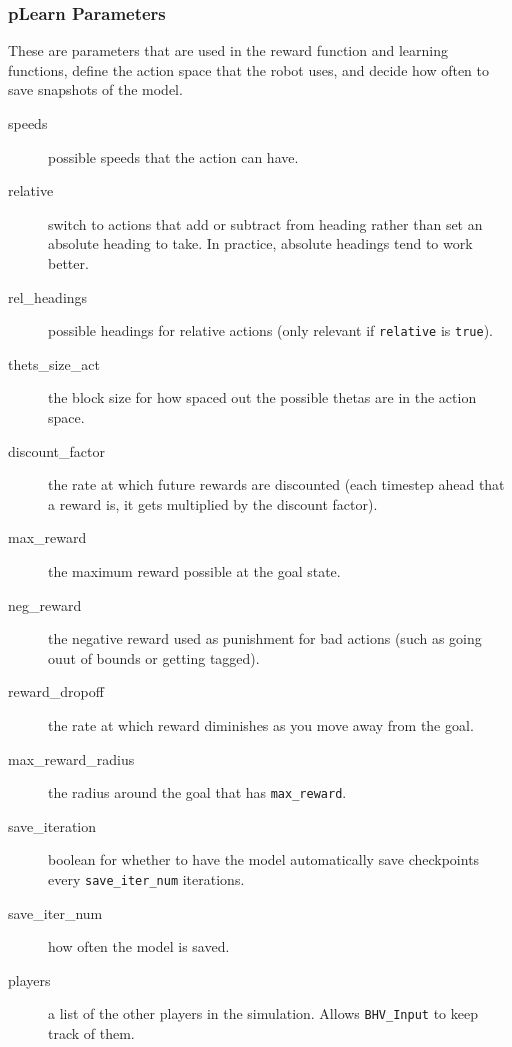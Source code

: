 \documentclass[onecolumn,letterpaper,11pt]{article}
\begin{document}
\subsubsection{pLearn Parameters}
These are parameters that are used in the reward function and learning functions, define the action space that the robot uses, and decide how often to save snapshots of the model.
\begin{description}
	\item[speeds] possible speeds that the action can have.
	
	\item[relative] switch to actions that add or subtract from heading rather than set an absolute heading to take. In practice, absolute headings tend to work better. 
	
	\item[rel\_headings] possible headings for relative actions (only relevant if \texttt{relative} is \texttt{true}).
	
	\item[thets\_size\_act] the block size for how spaced out the possible thetas are in the action space.
	
	\item[discount\_factor] the rate at which future rewards are discounted (each timestep ahead that a reward is, it gets multiplied by the discount factor).
	
	\item[max\_reward] the maximum reward possible at the goal state.
	
	\item[neg\_reward] the negative reward used as punishment for bad actions (such as going ouut of bounds or getting tagged).
	
	\item[reward\_dropoff] the rate at which reward diminishes as you move away from the goal.
	
	\item[max\_reward\_radius] the radius around the goal that has \texttt{max\_reward}.
	
	\item[save\_iteration] boolean for whether to have the model automatically save checkpoints every \texttt{save\_iter\_num} iterations. 
	
	\item[save\_iter\_num] how often the model is saved.
	
	\item[players] a list of the other players in the simulation. Allows 
	\texttt{BHV\_Input} to keep track of them. 
	

\end{description}
\end{document}

